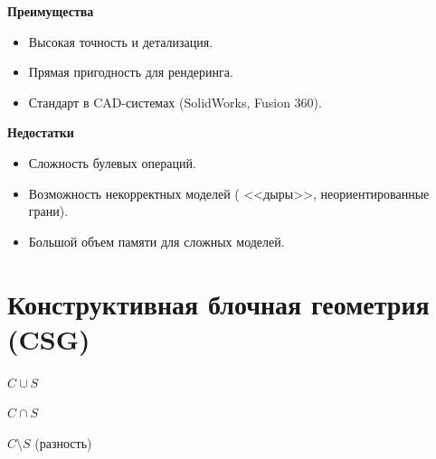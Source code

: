 \documentclass[10pt]{beamer}
\begin{document}
\begin{frame}\COVER{\frametitle{}}
	
	{
		\textbf{Преимущества}
		
		\begin{itemize}
			\item Высокая точность и детализация.
			
			\item Прямая пригодность для рендеринга.
			
			\item Стандарт в CAD-системах (SolidWorks, Fusion 360).
			
		\end{itemize}
	}
	{
		\textbf{Недостатки}
		
		\begin{itemize}
			
			\item Сложность булевых операций.
			
			\item Возможность некорректных моделей ( <<дыры>>, неориентированные грани).
			
			\item Большой объем памяти для сложных моделей.
			
		\end{itemize}
	}
	
\end{frame}

\section[CSG]{Конструктивная блочная геометрия (CSG)}

\begin{frame}
	
	{
		
		

	}
	{
		
		\centering 
		
		{
			\centering
			
			
			$C \cup S$  
		}
		{
			\centering
			
			
			$C \cap S$  
		}
		
		
		$ C \setminus  S$  (разность)
		
	}
	
	
	\begingroup 
	\renewcommand\thefootnote{}
	\endgroup
	
	
\end{frame}
\end{document}
